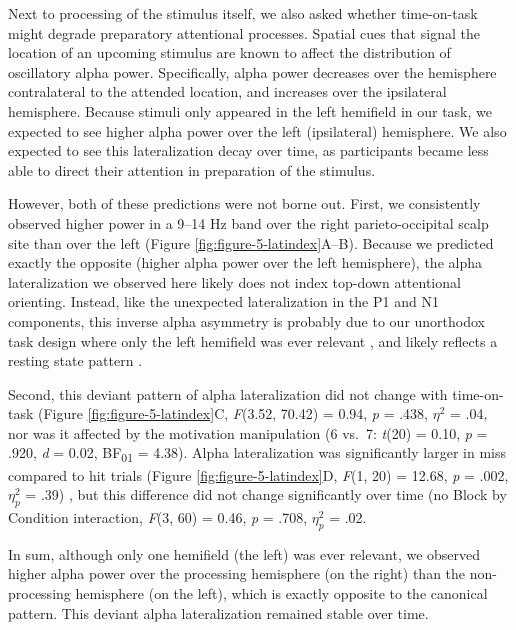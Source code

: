 \documentclass[11pt,english,]{memoir}
\begin{document}
Next to processing of the stimulus itself, we also asked whether time-on-task might degrade preparatory attentional processes. Spatial cues that signal the location of an upcoming stimulus are known to affect the distribution of oscillatory alpha power. Specifically, alpha power decreases over the hemisphere contralateral to the attended location, and increases over the ipsilateral hemisphere. Because stimuli only appeared in the left hemifield in our task, we expected to see higher alpha power over the left (ipsilateral) hemisphere. We also expected to see this lateralization decay over time, as participants became less able to direct their attention in preparation of the stimulus.

However, both of these predictions were not borne out. First, we consistently observed higher power in a 9--14 Hz band over the right parieto-occipital scalp site than over the left (Figure \ref{fig:figure-5-latindex}A--B). Because we predicted exactly the opposite (higher alpha power over the left hemisphere), the alpha lateralization we observed here likely does not index top-down attentional orienting. Instead, like the unexpected lateralization in the P1 and N1 components, this inverse alpha asymmetry is probably due to our unorthodox task design where only the left hemifield was ever relevant \autocite[as further discussed in][]{Slagter2016}, and likely reflects a resting state pattern \autocites{Benwell2018}{Wieneke1980}.

Second, this deviant pattern of alpha lateralization did not change with time-on-task (Figure \ref{fig:figure-5-latindex}C, \emph{F}(3.52, 70.42) = 0.94, \emph{p} = .438, \(\eta^2\) = .04, nor was it affected by the motivation manipulation (6 vs.~7: \emph{t}(20) = 0.10, \emph{p} = .920, \emph{d} = 0.02, BF\textsubscript{01} = 4.38). Alpha lateralization was significantly larger in miss compared to hit trials (Figure \ref{fig:figure-5-latindex}D, \emph{F}(1, 20) = 12.68, \emph{p} = .002, \(\eta^2_p\) = .39) \autocite{Slagter2016}, but this difference did not change significantly over time (no Block by Condition interaction, \emph{F}(3, 60) = 0.46, \emph{p} = .708, \(\eta^2_p\) = .02.

In sum, although only one hemifield (the left) was ever relevant, we observed higher alpha power over the processing hemisphere (on the right) than the non-processing hemisphere (on the left), which is exactly opposite to the canonical pattern. This deviant alpha lateralization remained stable over time.
\end{document}
